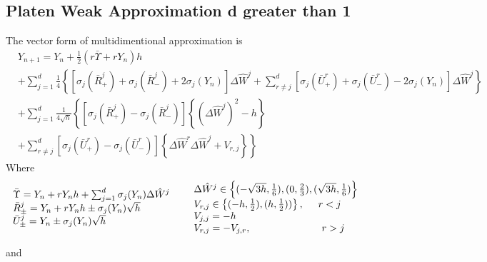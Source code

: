 \documentclass[]{beamer}
\begin{document}
\subsection*{Platen Weak Approximation d greater than 1}
\begin{frame}
\scriptsize
The vector form of multidimentional approximation is 
\begin{equation*}
\begin{split}
 &Y_{n+1} = Y_{n} + 
	  \frac{1}{2}( r\bar{\Upsilon}  + rY_n)h\\
         &+\sum^d_{j=1}\frac{1}{4}  \left\{
                           \left[  \sigma_j(\bar{R}^j_+ )  +  \sigma_j(\bar{R}^j_- )  + 2\sigma_j(Y_n)  \right]\Delta \hat{W}^j 
         +\sum^d_{r\neq j} \left[  \sigma_j(\bar{U}^r_+ )  +  \sigma_j(\bar{U}^r_- )  - 2\sigma_j(Y_n)  \right]\Delta \hat{W}^j 
                       \right\}  \\
	  &+\sum^d_{j=1}\frac{1}{4\sqrt{h} } \left\{
			    \left[  \sigma_j(\bar{R}^j_+ )  -  \sigma_j(\bar{R}^j_- )  \right] \left\{ (\Delta \hat{W}^j)^2 - h \right\} \right.\\
         &+\left.\sum^d_{r\neq j} \left[  \sigma_j(\bar{U}^r_+ )  -  \sigma_j(\bar{U}^r_- )  \right] \left\{ \Delta\hat{W}^r\Delta\hat{W}^j + V_{r,j} \right\}
                       \right\}
\end{split}
\end{equation*}
Where 
\begin{equation*}
\begin{array}{ll}
\bar{\Upsilon}=Y_n + rY_nh + \sum^d_{j=1} \sigma_j(Y_n) \Delta \hat{W}^j \\
\bar{R}^j_{\pm}=Y_n + rY_nh \pm \sigma_j (Y_n) \sqrt{h}  \\
\bar{U}^j_{\pm}=Y_n  \pm \sigma_j (Y_n) \sqrt{h}  \\
\end{array}
\hspace{0.5cm}
\begin{array}{ll}
\Delta \hat{W}^j \in \left\{ (-\sqrt{3h},\frac{1}{6}),(0,\frac{2}{3}),(\sqrt{3h},\frac{1}{6})   \right\} \\ 
V_{r,j} \in  \left\{ (-h,\frac{1}{2}),(h,\frac{1}{2}))   \right\}, \hspace{0.5cm} r < j \\  
V_{j,j} = -h  \\
V_{r,j} = -V_{j,r} , \hspace{2.5cm} r > j 
\end{array}
\end{equation*}


and

\end{frame}
\end{document}
